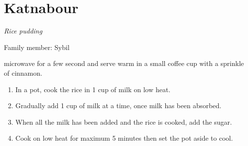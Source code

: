 \chapter{Katnabour}
\label{ch:katnabour}


\textit{Rice pudding}

Family member: Sybil

 microwave for a few second and serve warm in a small coffee cup with a sprinkle of cinnamon.



\begin{enumerate}
    \item In a pot, cook the rice in 1 cup of milk on low heat.
    \item Gradually add 1 cup of milk at a time, once milk has been absorbed.
    \item When all the milk has been added and the rice is cooked, add the sugar. 
    \item Cook on low heat for maximum 5 minutes then set the pot aside to cool.
\end{enumerate}
